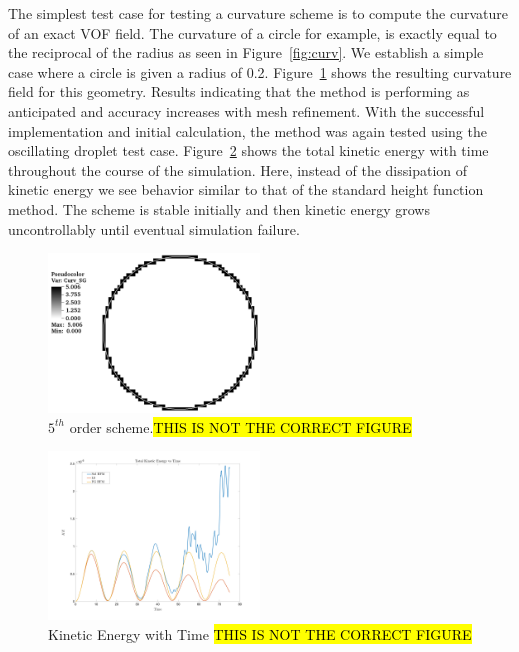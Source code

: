  The simplest test case for testing a curvature scheme is to compute the curvature of an exact VOF field. The curvature of a circle for example, is exactly equal to the reciprocal of the radius as seen in Figure~\ref{fig:curv}. We establish a simple case where a circle is given a radius of 0.2. Figure~\ref{fig:5thcurv} shows the resulting curvature field for this geometry. Results indicating that the method is performing as anticipated and accuracy increases with mesh refinement. With the successful implementation and initial calculation, the method was again tested using the oscillating droplet test case. Figure~\ref{fig:5thKE} shows the total kinetic energy with time throughout the course of the simulation. Here, instead of the dissipation of kinetic energy we see behavior similar to that of the standard height function method. The scheme is stable initially and then kinetic energy grows uncontrollably until eventual simulation failure.
\begin{figure}[htbp]
	\centering
	\includegraphics[width=0.5\textwidth]{figs/curvCalc.png}
	\caption{$5^{th}$ order scheme.\hl{THIS IS NOT THE CORRECT FIGURE}}
	\label{fig:5thcurv} 
\end{figure} 

\begin{figure}[h]
	\centering
	\includegraphics[width=0.5\textwidth]{figs/KEvT}
	\caption{Kinetic Energy with Time \hl{THIS IS NOT THE CORRECT FIGURE}}
	\label{fig:5thKE}
\end{figure}

